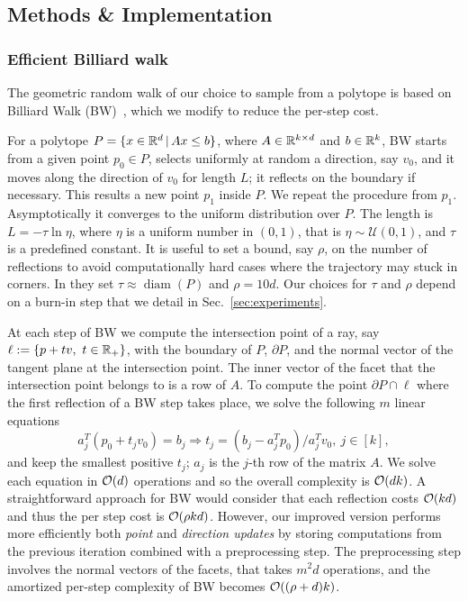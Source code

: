 \subsection{Methods \& Implementation}
\label{sec:mmcs-methods}

\subsubsection*{Efficient Billiard walk}
\label{subsec:mmcs-methods-bw}

   The geometric random walk of our choice
   to sample from a polytope
   is based on  Billiard Walk (BW)~\cite{Gryazina14},
   which we modify to reduce the per-step cost.

   For a polytope $P = \{ x \in {\mathbb R}^d \,|\, A x \leq b  \}$,
   where $A \in {\mathbb R}^{k \times d}$ and $b \in {\mathbb R}^k$,
   BW starts from a given point $p_0 \in P$,
   selects uniformly at random a
   direction, say $v_0$, and it moves along the direction of $v_0$ for length $L$;
   it reflects on the boundary if necessary. This results a new point $p_1$ inside
   $P$. We repeat the procedure from $p_1$. Asymptotically it converges to the
   uniform distribution over $P$. The length is $L=-\tau \ln \eta$, where $\eta$ is
   a uniform number in $(0,1)$, that is $\eta\sim\mathcal{U}(0,1)$, and $\tau$ is a
   predefined constant. It is useful to set a bound, say $\rho$, on the number of
   reflections to avoid computationally hard cases where the trajectory may stuck
   in corners. In \cite{Gryazina14} they set
   $\tau \approx \mathop{diam}(P)$ and $\rho =10d$.
   Our choices for $\tau$ and $\rho$ depend on a
   burn-in step that we detail in  Sec.~\ref{sec:experiments}.

   At each step of BW we
   compute the intersection point of a ray, say $\ell:=\{p+tv,\ t\in{\mathbb R}_+ \}$,
   with the boundary of $P$, $\partial P$, and the normal vector of the tangent
   plane at the intersection point.
   The inner vector of the facet that the intersection  point belongs to is a row of $A$.
   To compute the point $\partial P\cap\ell$ where the first reflection of a BW
   step takes place, we solve the following $m$ linear equations
   \begin{equation}\label{eq:boundary_oracle}
   a_j^T(p_0 + t_jv_0) = b_j \Rightarrow t_j = (b_j - a_j^Tp_0) / a_j^Tv_0,\ j \in[k],
   \end{equation}
   and keep the smallest positive $t_j$; $a_j$ is the $j$-th row of the matrix $A$.
   We solve each equation in $\mathcal{O}(d)$ operations
   and so the overall complexity is $\mathcal{O}(dk)$.
   A straightforward approach for BW would consider that each reflection costs $\mathcal{O}(kd)$ and thus the per step cost is $\mathcal{O}(\rho kd)$.
   However, our improved version performs more efficiently both \textit{point} and \textit{direction updates} by storing computations from the previous iteration combined with a preprocessing step. The preprocessing step involves the normal vectors of the facets, that takes $m^2 d$ operations,
   and the amortized per-step complexity of BW becomes $\mathcal{O}((\rho + d)k)$.


